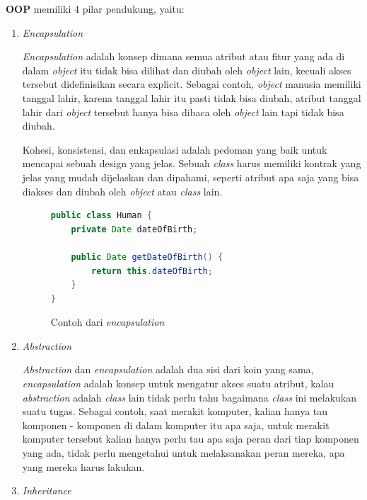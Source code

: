 \documentclass[a4paper]{article}
\begin{document}
\textbf{OOP} memiliki 4 pilar pendukung, yaitu:
\begin{enumerate}

    \item \textit{Encapsulation}

          \textit{Encapsulation} adalah konsep dimana semua atribut atau fitur yang ada di dalam \textit{object} itu tidak bisa dilihat dan diubah oleh \textit{object} lain, kecuali akses tersebut didefinisikan secara explicit\autocite{education-erin-oop-2020}. Sebagai contoh, \textit{object} manusia memiliki tanggal lahir, karena tanggal lahir itu pasti tidak bisa diubah, atribut tanggal lahir dari \textit{object} tersebut hanya bisa dibaca oleh \textit{object} lain tapi tidak bisa diubah.

          Kohesi, konsistensi, dan enkapsulasi adalah pedoman yang baik untuk mencapai sebuah design yang jelas. Sebuah \textit{class} harus memiliki kontrak yang jelas yang mudah dijelaskan dan dipahami, seperti atribut apa saja yang bisa diakses dan diubah oleh \textit{object} atau \textit{class} lain\autocite[368]{liang_liang_2021}.

          \begin{figure}[h]
              \centering
              \begin{lstlisting}[language=Java]
public class Human {
    private Date dateOfBirth;

    public Date getDateOfBirth() {
        return this.dateOfBirth;
    }
}\end{lstlisting}
              \caption{Contoh dari \textit{encapsulation}}
          \end{figure}
          \newpage

    \item \textit{Abstraction}

          \textit{Abstraction} dan \textit{encapsulation} adalah dua sisi dari koin yang sama, \textit{encapsulation} adalah konsep untuk mengatur akses suatu atribut, kalau \textit{abstraction} adalah \textit{class} lain tidak perlu tahu bagaimana \textit{class} ini melakukan suatu tugas\autocite[390-391]{liang_liang_2021}. Sebagai contoh, saat merakit komputer, kalian hanya tau komponen - komponen di dalam komputer itu apa saja, untuk merakit komputer tersebut kalian hanya perlu tau apa saja peran dari tiap komponen yang ada, tidak perlu mengetahui untuk melaksanakan peran mereka, apa yang mereka harus lakukan.

    \item \textit{Inheritance}


\end{enumerate}
\end{document}
